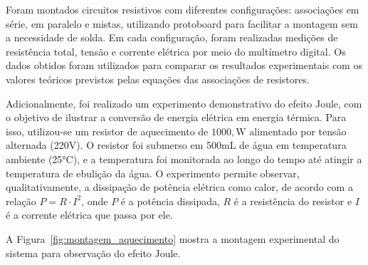 \documentclass[conference]{IEEEtran}
\begin{document}
Foram montados circuitos resistivos com diferentes configurações: associações em série, em paralelo e mistas, utilizando protoboard para facilitar a montagem sem a necessidade de solda. Em cada configuração, foram realizadas medições de resistência total, tensão e corrente elétrica por meio do multímetro digital. Os dados obtidos foram utilizados para comparar os resultados experimentais com os valores teóricos previstos pelas equações das associações de resistores.

Adicionalmente, foi realizado um experimento demonstrativo do efeito Joule, com o objetivo de ilustrar a conversão de energia elétrica em energia térmica. Para isso, utilizou-se um resistor de aquecimento de $1000,\text{W}$ alimentado por tensão alternada (220V). O resistor foi submerso em 500mL de água em temperatura ambiente (25°C), e a temperatura foi monitorada ao longo do tempo até atingir a temperatura de ebulição da água. O experimento permite observar, qualitativamente, a dissipação de potência elétrica como calor, de acordo com a relação $P=R\cdot I^2$, onde $P$ é a potência dissipada, $R$ é a resistência do resistor e $I$ é a corrente elétrica que passa por ele.

A Figura~\ref{fig:montagem_aquecimento} mostra a montagem experimental do sistema para observação do efeito Joule.

\end{document}
